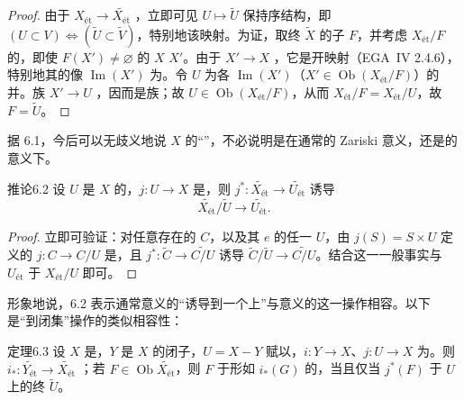 \begin{proof}
由于 $X_{\text{ét}}\to\widetilde{X_{\text{ét}}}$ ，立即可见 $U\mapsto\widetilde U$ 保持序结构，即 $(U\subset V)\Leftrightarrow(\widetilde U\subset\widetilde V)$，特别地该映射。为证，取终 $\widetilde X$ 的子 $F$，并考虑 $X_{\text{ét}}/F$ 的，即使 $F(X')\ne\varnothing$ 的 $X$  $X'$。由于 $X'\to X$ ，它是开映射（EGA~IV 2.4.6），特别地其的像 $\operatorname{Im}(X')$ 为。令 $U$ 为各 $\operatorname{Im}(X')$（$X'\in\operatorname{Ob}(X_{\text{ét}}/F)$）的并。族 $X'\to U$ ，因而是族；故 $U\in\operatorname{Ob}(X_{\text{ét}}/F)$，从而 $X_{\text{ét}}/F=X_{\text{ét}}/U$，故 $F=\widetilde U$。
\end{proof}
据 6.1，今后可以无歧义地说 $X$ 的“”，不必说明是在通常的 Zariski 意义，还是的意义下。
\begin{SGAresult}{推论}{6.2}
设 $U$ 是 $X$ 的，$j:U\to X$ 是，则 $j^*:\widetilde{X_{\text{ét}}}\to\widetilde{U_{\text{ét}}}$ 诱导
\[\widetilde{X_{\text{ét}}}/\widetilde U\longrightarrow\widetilde{U_{\text{ét}}}.\]
\end{SGAresult}
\begin{proof}
立即可验证：对任意存在的 $C$，以及其 $e$ 的任一 $U$，由 $j(S)=S\times U$ 定义的 $j:C\to C/U$ 是，且 $j^*:\widetilde C\to\widetilde{C/U}$ 诱导 $\widetilde C/\widetilde U\to\widetilde{C/U}$。结合这一一般事实与 $U_{\text{ét}}$ 于 $X_{\text{ét}}/U$ 即可。
\end{proof}
形象地说，6.2 表示通常意义的“诱导到一个上”与意义的这一操作相容。以下是“到闭集”操作的类似相容性：
\begin{SGAresult}{定理}{6.3}
设 $X$ 是，$Y$ 是 $X$ 的闭子，$U=X-Y$ 赋以，$i:Y\to X$、$j:U\to X$ 为。则 $i_*:\widetilde{Y_{\text{ét}}}\to\widetilde{X_{\text{ét}}}$ ；若 $F\in\operatorname{Ob}\widetilde{X_{\text{ét}}}$，则 $F$ 于形如 $i_*(G)$ 的，当且仅当 $j^*(F)$ 于 $U$ 上的终 $\widetilde U$。
\end{SGAresult}
